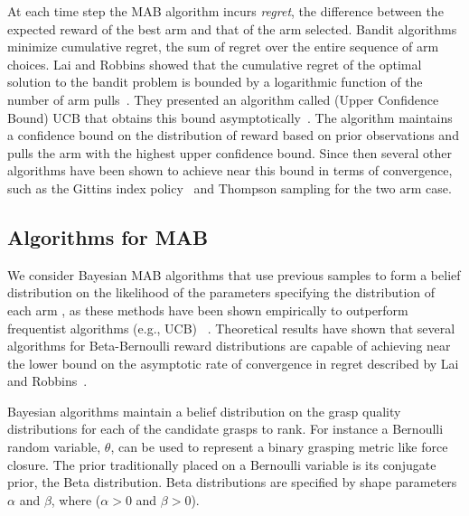 \documentclass[10pt, conference]{ieeeconf}      %
\begin{document}
At each time step the MAB algorithm incurs \textit{regret}, the difference between the expected reward of the best arm and that of the arm selected. Bandit algorithms minimize cumulative regret, the sum of regret over the entire sequence of arm choices.
Lai and Robbins showed that the cumulative regret of the optimal solution to the bandit problem is bounded by a logarithmic function of the number of arm pulls~\cite{lai1985asymptotically}.
They presented an algorithm called (Upper Confidence Bound) UCB that obtains this bound asymptotically~\cite{lai1985asymptotically}.
The algorithm maintains a confidence bound on the distribution of reward based on prior observations and pulls the arm with the highest upper confidence bound.
Since then several other algorithms have been shown to achieve near this bound in terms of convergence, such as the Gittins index policy~\cite{weber1992gittins} and Thompson sampling for the two arm case\cite{agrawal2011analysis}. 



\subsection{Algorithms for MAB}\label{sec:bandit_algorithm}
We consider Bayesian MAB algorithms that use previous samples to form a belief distribution on the likelihood of the parameters specifying the distribution of each arm \cite{weber1992gittins,agrawal2011analysis}, as these methods have been shown empirically to outperform frequentist algorithms (e.g., UCB) ~\cite{chapelle2011empirical, bachman2013greedy}. Theoretical results have shown that several algorithms for Beta-Bernoulli reward distributions are capable of achieving near the lower bound on the asymptotic rate of convergence in regret described by Lai and Robbins~\cite{gittins1983dynamic, agrawal2011analysis, kaufmann2012bayesian}.

Bayesian algorithms maintain a belief distribution on the grasp quality distributions for each of the candidate grasps to rank. For instance a Bernoulli random variable, $\theta$, can be used to represent a binary grasping metric like force closure. The prior traditionally placed on a Bernoulli variable is its conjugate prior, the Beta distribution. 
Beta distributions are specified by shape parameters $\alpha$ and $\beta$, where ($\alpha >0$ and $\beta >0$).
\end{document}
